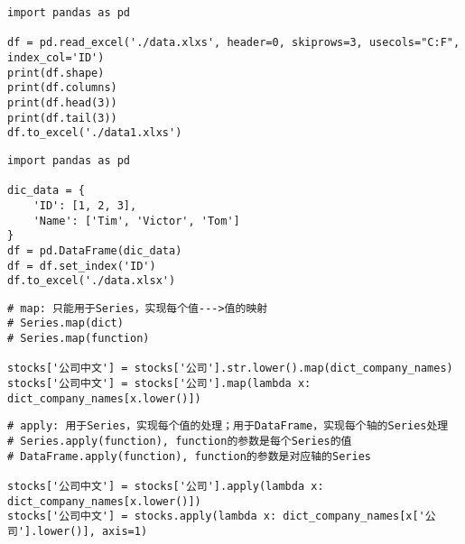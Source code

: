 \documentclass[a4paper]{ctexart}    %
\begin{document}
\begin{tcolorbox}[
         colback=red!5!white,
         colframe=teal,
         title=\textbf{pandas读取和保存文件}
    ]
\begin{verbatim}
import pandas as pd

df = pd.read_excel('./data.xlxs', header=0, skiprows=3, usecols="C:F", index_col='ID')
print(df.shape)
print(df.columns)
print(df.head(3))
print(df.tail(3))
df.to_excel('./data1.xlxs')
\end{verbatim}
\end{tcolorbox}

\begin{tcolorbox}[
         colback=red!5!white,
         colframe=teal,
         title=\textbf{pandas创建数据}
    ]
\begin{verbatim}
import pandas as pd

dic_data = {
    'ID': [1, 2, 3],
    'Name': ['Tim', 'Victor', 'Tom']
}
df = pd.DataFrame(dic_data)
df = df.set_index('ID')
df.to_excel('./data.xlsx')
\end{verbatim}
\end{tcolorbox}

\begin{tcolorbox}[
         colback=red!5!white,
         colframe=teal,
         title=\textbf{pandas数据转换函数map}
    ]
\begin{verbatim}
# map: 只能用于Series，实现每个值--->值的映射
# Series.map(dict)
# Series.map(function)

stocks['公司中文'] = stocks['公司'].str.lower().map(dict_company_names)
stocks['公司中文'] = stocks['公司'].map(lambda x: dict_company_names[x.lower()])
\end{verbatim}
\end{tcolorbox}


\begin{tcolorbox}[
         colback=red!5!white,
         colframe=teal,
         title=\textbf{pandas数据转换函数apply}
    ]
\begin{verbatim}
# apply: 用于Series，实现每个值的处理；用于DataFrame，实现每个轴的Series处理
# Series.apply(function), function的参数是每个Series的值
# DataFrame.apply(function), function的参数是对应轴的Series

stocks['公司中文'] = stocks['公司'].apply(lambda x: dict_company_names[x.lower()])
stocks['公司中文'] = stocks.apply(lambda x: dict_company_names[x['公司'].lower()], axis=1)
\end{verbatim}
\end{tcolorbox}
\end{document}
